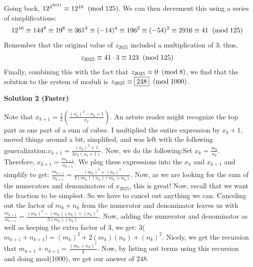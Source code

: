 \begin{enumerate}
 Going back, $12^{2^{2024}}\equiv12^{16}\hspace{2mm}(\text{mod}\hspace{1mm}125)$. We can then decrement this using a series of simplifications:
 \[12^{16}\equiv144^8\equiv19^8\equiv361^4\equiv(-14)^4\equiv196^2\equiv(-54)^2\equiv2916\equiv41\hspace{2mm}(\text{mod}\hspace{1mm}125)\]Remember that the original value of $z_{2025}$ included a multiplication of $3$; thus,
 \[z_{2025}\equiv41\cdot3\equiv123\hspace{2mm}(\text{mod}\hspace{1mm}125)\]Finally, combining this with the fact that $z_{2025}\equiv0\hspace{2mm}(\text{mod}\hspace{1mm}8)$, we find that the solution to the system of moduli is $z_{2025}\equiv\boxed{248}\hspace{2mm}(\text{mod}\hspace{1mm}1000)$.

 



\textbf{Solution 2 (Faster)}

Note that $x_{k+1} = \frac{1}{3}\left( \frac{(x_k)^{2} - x_k + 1}{x_k} \right)$. An astute reader might recognize the top part as one part of a sum of cubes. I multiplied the entire expression by $x_k + 1$, moved things around a bit, simplified, and was left with the following generalization:$x_{k+1} = \frac{(x_k)^{3} + 1}{3x_k(x_k + 1)}$. Now, we do the following:Set $x_k = \frac{m_k}{n_k}$. Therefore, $x_{k+1} = \frac{m_{k+1}}{n_{k+1}}$. We plug these expressions into the $x_k$ and $x_{k+1}$ and simplify to get: $\frac{m_{k+1}}{n_{k+1}} = \frac{(m_k)^{3} + (n_k)^{3}}{3(m_k)(n_k)(m_k + n_k)}$. Now, as we are looking for the sum of the numerators and denominators of $x_{2025}$, this is great! Now, recall that we want the fraction to be simplest. So we have to cancel out anything we can. Canceling out the factor of $m_k + n_k$ from the numerator and denominator leaves us with $\frac{m_{k+1}}{n_{k+1}} = \frac{(m_k)^{2} - (m_k)(n_k) + (n_k)^{2}}{3(m_k)(n_k)}$. Now, adding the numerator and denominator as well as keeping the extra factor of $3$, we get: 3($m_{k+1} + n_{k+1}) = (m_k)^{2} + 2(m_k)(n_k) + (n_k)^{2}$. Nicely, we get the recursion that $m_{k+1} + n_{k+1} = \frac{(m_k + n_k)^{2}}{3}$. Now, by listing out terms using this recursion and doing mod(1000), we get our answer of $\boxed{248}$.


\end{enumerate}
